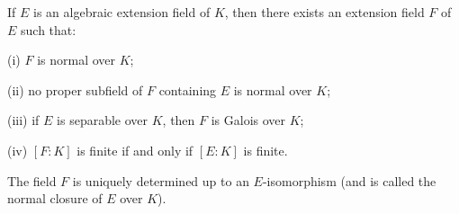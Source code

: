If $E$ is an algebraic extension field of $K$, then there exists an extension field $F$ of $E$ such that:

(i) $F$ is normal over $K$;

(ii) no proper subfield of $F$ containing $E$ is normal over $K$;

(iii) if $E$ is separable over $K$, then $F$ is Galois over $K$;

(iv) $[F : K]$ is finite if and only if $[E : K]$ is finite.

The field $F$ is uniquely determined up to an $E$-isomorphism (and is called the normal closure of $E$ over $K$).
